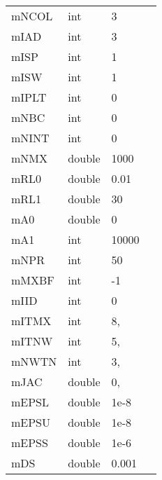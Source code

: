 \begin{landscape}
\begin{longtable}{p{4cm} l p{3cm}  p{10cm}}
mNCOL                               &   int                 & 3        &   \\
mIAD                                &   int                 & 3        &   \\
mISP                                &   int                 & 1        &   \\
mISW                                &   int                 & 1        &   \\
mIPLT                               &   int                 & 0        &   \\
mNBC                                &   int                 & 0        &   \\
mNINT                               &   int                 & 0        &   \\
mNMX                                &   double              & 1000     &   \\
mRL0                                &   double              & 0.01     &   \\
mRL1                                &   double              & 30       &   \\
mA0                                 &   double              & 0        &   \\
mA1                                 &   int                 & 10000    &   \\
mNPR                                &   int                 & 50       &   \\
mMXBF                               &   int                 & -1       &   \\
mIID                                &   int                 & 0        &   \\
mITMX                               &   int                 & 8,       &   \\
mITNW                               &   int                 & 5,       &   \\
mNWTN                               &   int                 & 3,       &   \\
mJAC                                &   double              & 0,       &   \\
mEPSL                               &   double              & 1e-8     &   \\
mEPSU                               &   double              & 1e-8     &   \\
mEPSS                               &   double              & 1e-6     &   \\
mDS                                 &   double              & 0.001    &   \\

\end{longtable}
\end{landscape}
